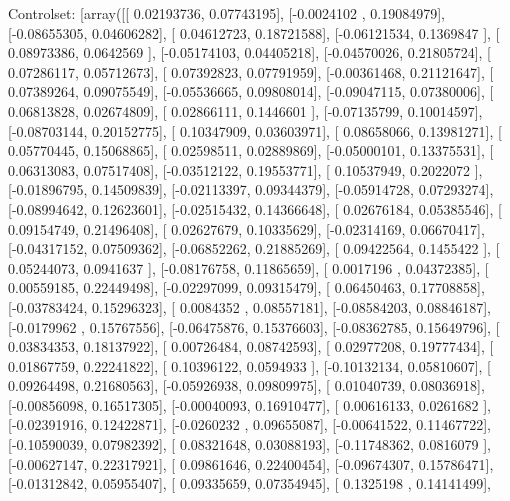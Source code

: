 \documentclass{article}
\begin{document}
Controlset: [array([[ 0.02193736,  0.07743195],
       [-0.0024102 ,  0.19084979],
       [-0.08655305,  0.04606282],
       [ 0.04612723,  0.18721588],
       [-0.06121534,  0.1369847 ],
       [ 0.08973386,  0.0642569 ],
       [-0.05174103,  0.04405218],
       [-0.04570026,  0.21805724],
       [ 0.07286117,  0.05712673],
       [ 0.07392823,  0.07791959],
       [-0.00361468,  0.21121647],
       [ 0.07389264,  0.09075549],
       [-0.05536665,  0.09808014],
       [-0.09047115,  0.07380006],
       [ 0.06813828,  0.02674809],
       [ 0.02866111,  0.1446601 ],
       [-0.07135799,  0.10014597],
       [-0.08703144,  0.20152775],
       [ 0.10347909,  0.03603971],
       [ 0.08658066,  0.13981271],
       [ 0.05770445,  0.15068865],
       [ 0.02598511,  0.02889869],
       [-0.05000101,  0.13375531],
       [ 0.06313083,  0.07517408],
       [-0.03512122,  0.19553771],
       [ 0.10537949,  0.2022072 ],
       [-0.01896795,  0.14509839],
       [-0.02113397,  0.09344379],
       [-0.05914728,  0.07293274],
       [-0.08994642,  0.12623601],
       [-0.02515432,  0.14366648],
       [ 0.02676184,  0.05385546],
       [ 0.09154749,  0.21496408],
       [ 0.02627679,  0.10335629],
       [-0.02314169,  0.06670417],
       [-0.04317152,  0.07509362],
       [-0.06852262,  0.21885269],
       [ 0.09422564,  0.1455422 ],
       [ 0.05244073,  0.0941637 ],
       [-0.08176758,  0.11865659],
       [ 0.0017196 ,  0.04372385],
       [ 0.00559185,  0.22449498],
       [-0.02297099,  0.09315479],
       [ 0.06450463,  0.17708858],
       [-0.03783424,  0.15296323],
       [ 0.0084352 ,  0.08557181],
       [-0.08584203,  0.08846187],
       [-0.0179962 ,  0.15767556],
       [-0.06475876,  0.15376603],
       [-0.08362785,  0.15649796],
       [ 0.03834353,  0.18137922],
       [ 0.00726484,  0.08742593],
       [ 0.02977208,  0.19777434],
       [ 0.01867759,  0.22241822],
       [ 0.10396122,  0.0594933 ],
       [-0.10132134,  0.05810607],
       [ 0.09264498,  0.21680563],
       [-0.05926938,  0.09809975],
       [ 0.01040739,  0.08036918],
       [-0.00856098,  0.16517305],
       [-0.00040093,  0.16910477],
       [ 0.00616133,  0.0261682 ],
       [-0.02391916,  0.12422871],
       [-0.0260232 ,  0.09655087],
       [-0.00641522,  0.11467722],
       [-0.10590039,  0.07982392],
       [ 0.08321648,  0.03088193],
       [-0.11748362,  0.0816079 ],
       [-0.00627147,  0.22317921],
       [ 0.09861646,  0.22400454],
       [-0.09674307,  0.15786471],
       [-0.01312842,  0.05955407],
       [ 0.09335659,  0.07354945],
       [ 0.1325198 ,  0.14141499],
\end{document}
